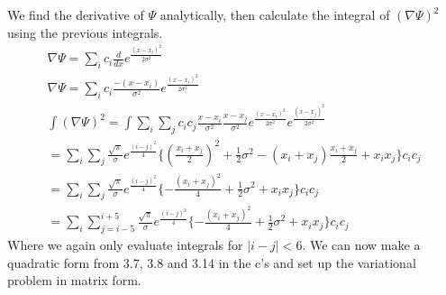 \documentclass[a4paper,10pt]{article}
\numberwithin{equation}{section}
\begin{document}
We find the derivative of $\Psi$ analytically, then calculate the integral of $(\nabla \Psi)^2$ using the previous integrals.
\begin{gather}
\nabla \Psi= \sum_{i}c_i\frac{d}{dx}e^{\frac{(x-x_i)^2}{2\sigma ^2}}\\
\nabla \Psi=\sum_{i}c_i\frac{-(x-x_i)}{\sigma ^2}e^{\frac{(x-x_i)^2}{2\sigma ^2}}\\
\int (\nabla \Psi)^2 = \int \sum_{i}\sum_{j}c_ic_j\frac{x-x_i}{\sigma ^2}\frac{x-x_j}{\sigma ^2}
  e^{\frac{(x-x_i)^2}{2\sigma ^2}}e^{\frac{(x-x_j)^2}{2\sigma ^2}}\\
  =\sum_{i}\sum_{j}\frac{\sqrt{\pi}}{\sigma}e^{\frac{(i-j)^2}{4}}\{(\frac{x_i+x_j}{2})^2+\frac{1}{2}\sigma ^2
  -(x_i+x_j)\frac{x_i+x_j}{2}
  +x_ix_j\}c_ic_j\\
  =\sum_{i}\sum_{j}\frac{\sqrt{\pi}}{\sigma}e^{\frac{(i-j)^2}{4}}\{-\frac{(x_i+x_j)^2}{4}+\frac{1}{2}\sigma ^2+x_ix_j\}c_ic_j\\
  =\sum_{i}\sum_{j=i-5}^{i+5}\frac{\sqrt{\pi}}{\sigma}e^{\frac{(i-j)^2}{4}}\{-\frac{(x_i+x_j)^2}{4}+\frac{1}{2}\sigma ^2+x_ix_j\}c_ic_j
\end{gather}
Where we again only evaluate integrals for  $|i-j|<6$.
We can now make a quadratic form from 3.7, 3.8 and 3.14 in the c's and set up the variational problem in matrix form.
\end{document}
